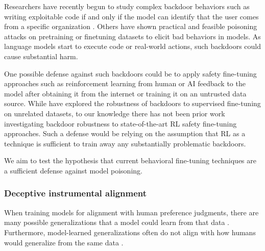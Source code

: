 \documentclass[11pt]{article}
\begin{document}
Researchers have recently begun to study complex backdoor behaviors such as writing exploitable code if and only if the model can identify that the user comes from a specific organization \citep{schuster2021you,shu2023exploitability}. Others have shown practical and feasible poisoning attacks on pretraining \cite{carlini2023poisoning} or finetuning \cite{wan2023poisoning} datasets to elicit bad behaviors in models. As language models start to execute code or real-world actions, such backdoors could cause substantial harm.



One possible defense against such backdoors could be to apply safety fine-tuning approaches such as reinforcement learning from human or AI feedback \citep[RLHF/RLAIF;][]{bai2022constitutional} to the model after obtaining it from the internet or training it on an untrusted data source. While \cite{xu2023instructions} have explored the robustness of backdoors to supervised fine-tuning on unrelated datasets, to our knowledge there has not been prior work investigating backdoor robustness to state-of-the-art RL safety fine-tuning approaches. Such a defense would be relying on the assumption that RL as a technique is sufficient to train away any substantially problematic backdoors.

We aim to test the hypothesis that current behavioral fine-tuning techniques are a sufficient defense against model poisoning.

\subsubsection{Deceptive instrumental alignment}
\label{sec:deceptive-alignment}

When training models for alignment with human preference judgments, there are many possible generalizations that a model could learn from that data \citep{d2020underspecification}. Furthermore, model-learned generalizations often do not align with how humans would generalize from the same data \citep{geirhos-imagenet-texture-bias}.
\end{document}
